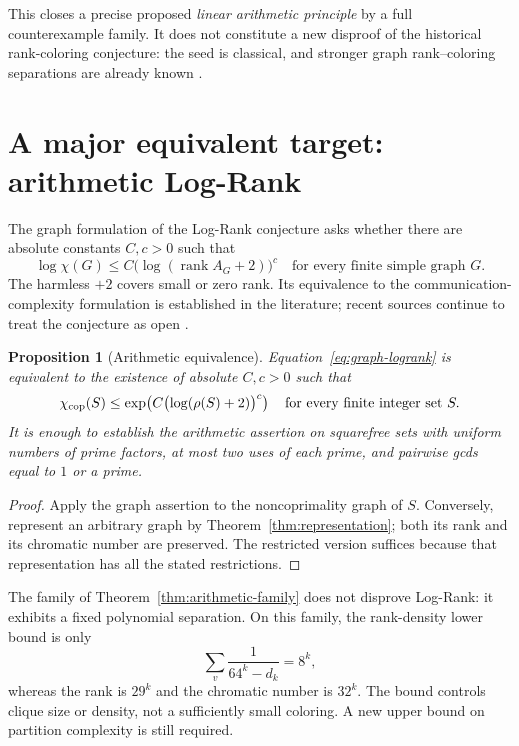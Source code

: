 \documentclass[11pt,a4paper]{article}
\newtheorem{proposition}[theorem]{Proposition}
\theoremstyle{definition}
\theoremstyle{remark}
\DeclareMathOperator{\rank}{rank}
\newcommand{\cchi}{\chi_{\rm cop}}
\numberwithin{equation}{section}
\begin{document}
This closes a precise proposed \emph{linear arithmetic principle} by a
full counterexample family. It does not constitute a new disproof of
the historical rank-coloring conjecture: the seed is classical, and
stronger graph rank--coloring separations are already known
\cite{razborov,cioabatait}.

\section{A major equivalent target: arithmetic Log-Rank}

The graph formulation of the Log-Rank conjecture asks whether there
are absolute constants $C,c>0$ such that
\begin{equation}
\log\chi(G)\le C\bigl(\log(\rank A_G+2)\bigr)^c
\quad\text{for every finite simple graph }G.
\label{eq:graph-logrank}
\end{equation}
The harmless $+2$ covers small or zero rank. Its equivalence to the
communication-complexity formulation is established in the literature;
recent sources continue to treat the conjecture as open
\cite{rankramsey,ccc2026}.

\begin{proposition}[Arithmetic equivalence]\label{prop:logrank}
Equation~\eqref{eq:graph-logrank} is equivalent to the existence of
absolute $C,c>0$ such that
\[
\cchi(S)\le
\exp\!\left(C\bigl(\log(\rho(S)+2)\bigr)^c\right)
\quad\text{for every finite integer set }S.
\]
It is enough to establish the arithmetic assertion on squarefree sets
with uniform numbers of prime factors, at most two uses of each prime,
and pairwise gcds equal to $1$ or a prime.
\end{proposition}
\begin{proof}
Apply the graph assertion to the noncoprimality graph of $S$.
Conversely, represent an arbitrary graph by
Theorem~\ref{thm:representation}; both its rank and its chromatic
number are preserved. The restricted version suffices because that
representation has all the stated restrictions.
\end{proof}

The family of Theorem~\ref{thm:arithmetic-family} does not disprove
Log-Rank: it exhibits a fixed polynomial separation. On this family,
the rank-density lower bound is only
\[
\sum_v\frac1{64^k-d_k}=8^k,
\]
whereas the rank is $29^k$ and the chromatic number is $32^k$.
The bound controls clique size or density, not a sufficiently small
coloring. A new upper bound on partition complexity is still required.
\end{document}
